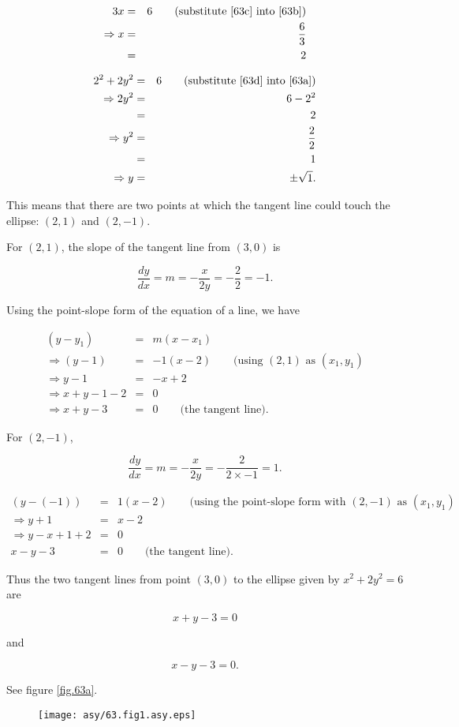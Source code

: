 \begin{eqnarray}
	3x&=&6\qquad\mbox{(substitute \ref{63c} into \ref{63b})}\nonumber\\
	\Rightarrow x&=&\frac{6}{3}\label{63d}\\
	&=&2\nonumber
\end{eqnarray}

\begin{eqnarray*}
	2^2+2y^2&=&6\qquad\mbox{(substitute \ref{63d} into \ref{63a})}\\
	\Rightarrow2y^2&=&6-2^2\\
	&=&2\\
	\Rightarrow y^2&=&\frac{2}{2}\\
	&=&1\\
	\Rightarrow y&=&\pm\sqrt{1}.
\end{eqnarray*}

This means that there are two points at which the tangent line could touch the ellipse: $\left(2,1\right)$ and $\left(2,-1\right)$.

For $\left(2,1\right)$, the slope of the tangent line from $\left(3,0\right)$ is

\[\frac{dy}{dx}=m=-\frac{x}{2y}=-\frac{2}{2}=-1.\]

Using the point-slope form of the equation of a line, we have

\begin{eqnarray*}
    \left(y-y_1\right)&=&m\left(x-x_1\right)\\
    \Rightarrow\left(y-1\right)&=&-1\left(x-2\right)\qquad\mbox{(using }\left(2,1\right)\mbox{ as }\left(x_1,y_1\right)\\
    \Rightarrow y-1&=&-x+2\\
    \Rightarrow x+y-1-2&=&0\\
    \Rightarrow x+y-3&=&0\qquad\mbox{(the tangent line).}
\end{eqnarray*}

For $\left(2,-1\right)$,

\[\frac{dy}{dx}=m=-\frac{x}{2y}=-\frac{2}{2\times-1}=1.\]

\begin{eqnarray*}
    \left(y-\left(-1\right)\right)&=&1\left(x-2\right)\qquad\mbox{(using the point-slope form with }\left(2,-1\right)\mbox{ as }\left(x_1,y_1\right)\\
    \Rightarrow y+1&=&x-2\\
    \Rightarrow y-x+1+2&=&0\\
    x-y-3&=&0\qquad\mbox{(the tangent line).}
\end{eqnarray*}

Thus the two tangent lines from point $\left(3,0\right)$ to the ellipse given by $x^2+2y^2=6$ are

\[x+y-3=0\]

and

\[x-y-3=0.\]

See figure \vref{fig.63a}.

\begin{figure}\caption{}\begin{center}\label{fig.63a}\texttt{[image: asy/63.fig1.asy.eps]}\end{center}\end{figure}
